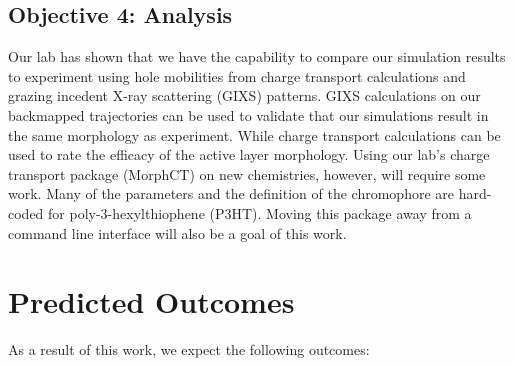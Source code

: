 \subsection*{Objective 4: Analysis}

Our lab has shown that we have the capability to compare our simulation results to experiment using hole mobilities from charge transport calculations\cite{Jones2017,Miller2018a} and grazing incedent X-ray scattering (GIXS) patterns\cite{Miller2018}.
GIXS calculations on our backmapped trajectories can be used to validate that our simulations result in the same morphology as experiment.
While charge transport calculations can be used to rate the efficacy of the active layer morphology.
Using our lab's charge transport package (MorphCT) on new chemistries, however, will require some work.
Many of the parameters and the definition of the chromophore are hard-coded for poly-3-hexylthiophene (P3HT).
Moving this package away from a command line interface will also be a goal of this work.

\section*{Predicted Outcomes}

As a result of this work, we expect the following outcomes:

